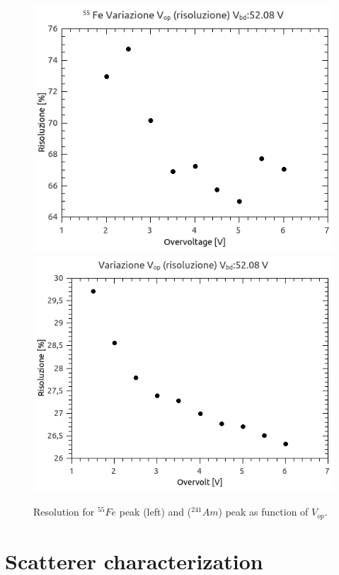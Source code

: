 \documentclass[10pt,a4paper, openany]{book}
\begin{document}
\begin{figure}[!h]
\begin{center}
\includegraphics[scale=0.35]{imm/resfe.png}
\includegraphics[scale=0.35]{imm/resam.png}
\end{center}
\caption{Resolution for $^{55}Fe$ peak (left) and ($^{241}Am$) peak as function of $V_{op}$.} 
\label{fig:res}
\end{figure}

\chapter{Scatterer characterization}
\end{document}
